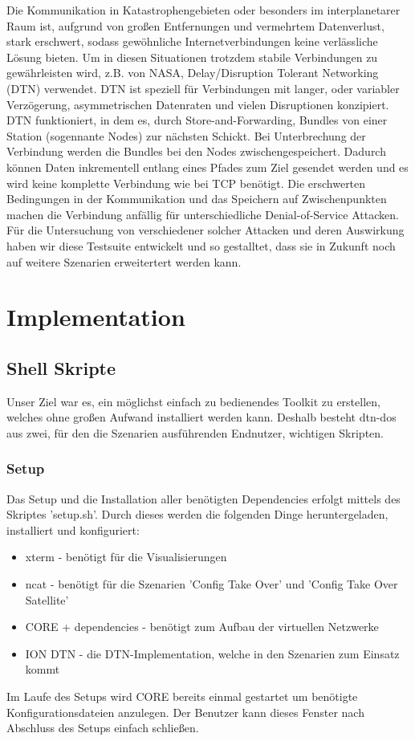 \documentclass{article}
\begin{document}
Die Kommunikation in Katastrophengebieten oder besonders im interplanetarer Raum ist, aufgrund von großen Entfernungen und vermehrtem Datenverlust, stark erschwert, sodass gewöhnliche Internetverbindungen keine verlässliche Lösung bieten. Um in diesen Situationen trotzdem stabile Verbindungen zu gewährleisten wird, z.B. von NASA, Delay/Disruption Tolerant Networking (DTN) verwendet.
DTN ist speziell für Verbindungen mit langer, oder variabler Verzögerung, asymmetrischen Datenraten und vielen Disruptionen konzipiert. DTN funktioniert, in dem es, durch Store-and-Forwarding, Bundles von einer Station (sogennante Nodes) zur nächsten Schickt. Bei Unterbrechung der Verbindung werden die Bundles bei den Nodes zwischengespeichert. Dadurch können Daten inkrementell entlang eines Pfades zum Ziel gesendet werden und es wird keine komplette Verbindung wie bei TCP benötigt. 
Die erschwerten Bedingungen in der Kommunikation und das Speichern auf Zwischenpunkten machen die Verbindung anfällig für unterschiedliche Denial-of-Service Attacken. Für die Untersuchung von verschiedener solcher Attacken und deren Auswirkung haben wir diese Testsuite entwickelt und so gestalltet, dass sie in Zukunft noch auf weitere Szenarien erweitertert werden kann.  

\section{Implementation}
\subsection{Shell Skripte}
Unser Ziel war es, ein möglichst einfach zu bedienendes Toolkit zu erstellen, welches ohne großen Aufwand installiert werden kann. Deshalb besteht dtn-dos aus zwei, für den die Szenarien ausführenden Endnutzer, wichtigen Skripten.
\subsubsection{Setup}
Das Setup und die Installation aller benötigten Dependencies erfolgt mittels des Skriptes 'setup.sh'. Durch dieses werden die folgenden Dinge heruntergeladen, installiert und konfiguriert:
\begin{itemize}
    \item xterm - benötigt für die Visualisierungen
    \item ncat - benötigt für die Szenarien 'Config Take Over' und 'Config Take Over Satellite'
    \item CORE + dependencies - benötigt zum Aufbau der virtuellen Netzwerke
    \item ION DTN - die DTN-Implementation, welche in den Szenarien zum Einsatz kommt
\end{itemize}
Im Laufe des Setups wird CORE bereits einmal gestartet um benötigte Konfigurationsdateien anzulegen. Der Benutzer kann dieses Fenster nach Abschluss des Setups einfach schließen. 
\end{document}

